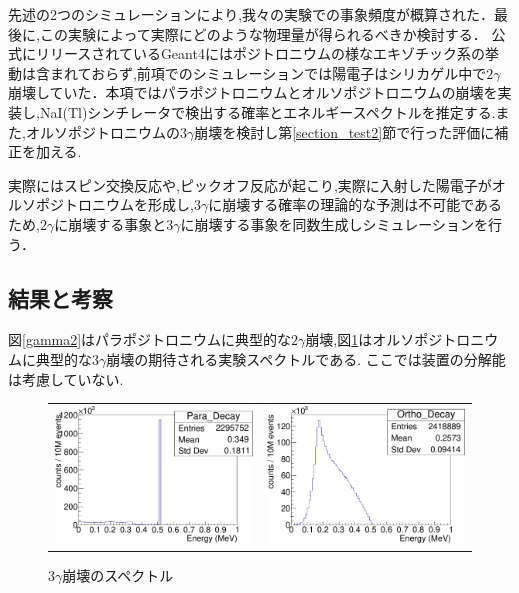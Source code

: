先述の2つのシミュレーションにより,我々の実験での事象頻度が概算された．最後に,この実験によって実際にどのような物理量が得られるべきか検討する．
公式にリリースされているGeant4にはポジトロニウムの様なエキゾチック系の挙動は含まれておらず,前項でのシミュレーションでは陽電子はシリカゲル中で$2\gamma$崩壊していた．本項ではパラポジトロニウムとオルソポジトロニウムの崩壊を実装し,NaI(Tl)シンチレータで検出する確率とエネルギースペクトルを推定する.また,オルソポジトロニウムの$3\gamma$崩壊を検討し第\ref{section_test2}節で行った評価に補正を加える.

実際にはスピン交換反応や,ピックオフ反応が起こり,実際に入射した陽電子がオルソポジトロニウムを形成し,$3\gamma$に崩壊する確率の理論的な予測は不可能であるため,$2\gamma$に崩壊する事象と$3\gamma$に崩壊する事象を同数生成しシミュレーションを行う．

\subsection{結果と考察}

図\ref{gamma2}はパラポジトロニウムに典型的な$2\gamma$崩壊,図\ref{gamma3}はオルソポジトロニウムに典型的な$3\gamma$崩壊の期待される実験スペクトルである.
ここでは装置の分解能は考慮していない.

\begin{figure}[htbp]
	\begin{tabular}{cc}

	\centering
		\begin{minipage}{0.5\hsize}
		\includegraphics[width=7cm]{fig/gamma2.pdf}
	\caption{$2\gamma$崩壊のスペクトル}
	\label{gamma2}
		\end{minipage}&

		\begin{minipage}{0.5\hsize}
	\centering
		\includegraphics[width=7cm]{fig/gamma3.pdf}
	\caption{$3\gamma$崩壊のスペクトル}
	\label{gamma3}
		\end{minipage}

		\end{tabular}
\end{figure}

